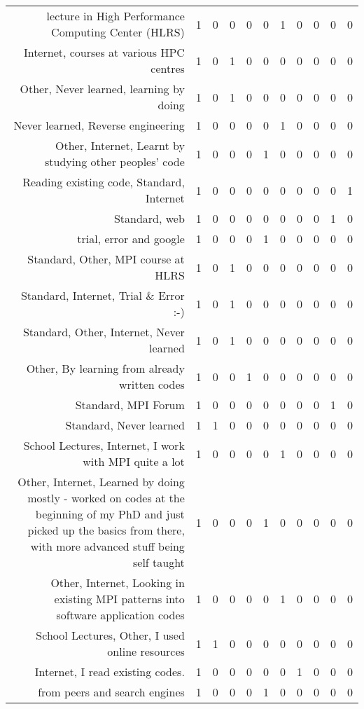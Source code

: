 {\begin{landscape}
\begin{longtable}[htb]{r|c|c|c|c|c|c|c|c|c|c}
{lecture in High Performance Computing Center (HLRS)} & 1 & 0 & 0 & 0 & 0 & 1 & 0 & 0 & 0 & 0 \\%
{Internet, courses at various HPC centres} & 1 & 0 & 1 & 0 & 0 & 0 & 0 & 0 & 0 & 0 \\%
{Other, Never learned, learning by doing} & 1 & 0 & 1 & 0 & 0 & 0 & 0 & 0 & 0 & 0 \\%
{Never learned, Reverse engineering} & 1 & 0 & 0 & 0 & 0 & 1 & 0 & 0 & 0 & 0 \\%
{Other, Internet, Learnt by studying other peoples' code} & 1 & 0 & 0 & 0 & 1 & 0 & 0 & 0 & 0 & 0 \\%
{Reading existing code, Standard, Internet} & 1 & 0 & 0 & 0 & 0 & 0 & 0 & 0 & 0 & 1 \\%
{Standard, web} & 1 & 0 & 0 & 0 & 0 & 0 & 0 & 0 & 1 & 0 \\%
{trial, error and google} & 1 & 0 & 0 & 0 & 1 & 0 & 0 & 0 & 0 & 0 \\%
{Standard, Other, MPI course at HLRS} & 1 & 0 & 1 & 0 & 0 & 0 & 0 & 0 & 0 & 0 \\%
{Standard, Internet, Trial \& Error :-)} & 1 & 0 & 1 & 0 & 0 & 0 & 0 & 0 & 0 & 0 \\%
{Standard, Other, Internet, Never learned} & 1 & 0 & 1 & 0 & 0 & 0 & 0 & 0 & 0 & 0 \\%
{Other, By learning from already written codes} & 1 & 0 & 0 & 1 & 0 & 0 & 0 & 0 & 0 & 0 \\%
{Standard, MPI Forum} & 1 & 0 & 0 & 0 & 0 & 0 & 0 & 0 & 1 & 0 \\%
{Standard, Never learned} & 1 & 1 & 0 & 0 & 0 & 0 & 0 & 0 & 0 & 0 \\%
{School Lectures, Internet, I work with MPI quite a lot} & 1 & 0 & 0 & 0 & 0 & 1 & 0 & 0 & 0 & 0 \\%
{Other, Internet, Learned by doing mostly - worked on codes at the beginning of my PhD and just picked up the basics from there, with more advanced stuff being self taught} & 1 & 0 & 0 & 0 & 1 & 0 & 0 & 0 & 0 & 0 \\%
{Other, Internet, Looking in existing MPI patterns into software application codes} & 1 & 0 & 0 & 0 & 0 & 1 & 0 & 0 & 0 & 0 \\%
{School Lectures, Other, I used online resources} & 1 & 1 & 0 & 0 & 0 & 0 & 0 & 0 & 0 & 0 \\%
{Internet, I read existing codes.} & 1 & 0 & 0 & 0 & 0 & 0 & 1 & 0 & 0 & 0 \\%
{from peers and search engines} & 1 & 0 & 0 & 0 & 1 & 0 & 0 & 0 & 0 & 0 \\%

\end{longtable}
\end{landscape}}
